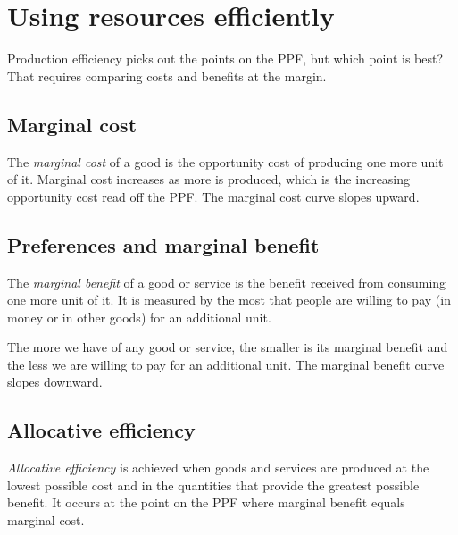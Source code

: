 \section{Using resources efficiently}

Production efficiency picks out the points on the PPF, but which point is best? That
requires comparing costs and benefits at the margin.

\subsection{Marginal cost}

\begin{definition}
The \emph{marginal cost} of a good is the opportunity cost of producing one more unit of
it. Marginal cost increases as more is produced, which is the increasing opportunity
cost read off the PPF. The marginal cost curve slopes upward.
\end{definition}

\subsection{Preferences and marginal benefit}

\begin{definition}
The \emph{marginal benefit} of a good or service is the benefit received from consuming
one more unit of it. It is measured by the most that people are willing to pay (in money
or in other goods) for an additional unit.
\end{definition}

\begin{important}
The more we have of any good or service, the smaller is its marginal benefit and the less
we are willing to pay for an additional unit. The marginal benefit curve slopes downward.
\end{important}

\subsection{Allocative efficiency}

\begin{definition}
\emph{Allocative efficiency} is achieved when goods and services are produced at the
lowest possible cost and in the quantities that provide the greatest possible benefit.
It occurs at the point on the PPF where marginal benefit equals marginal cost.
\end{definition}


